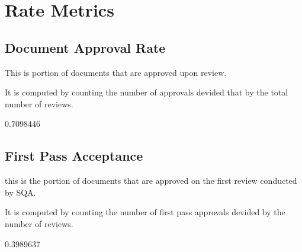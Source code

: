 \documentclass{article}
\begin{document}
\section{Rate Metrics}
\subsection{Document Approval Rate}
This is portion of documents that are approved upon review.

It is computed by counting the number of approvals devided that by the total number of reviews.

\begin{Schunk}
\begin{Soutput}
[1] 0.7098446
\end{Soutput}
\end{Schunk}

\subsection{First Pass Acceptance}
this is the portion of documents that are approved on the first review conducted
by SQA.

It is computed by counting the number of first pass approvals devided by
the number of reviews.

\begin{Schunk}
\begin{Soutput}
[1] 0.3989637
\end{Soutput}
\end{Schunk}
\end{document}
